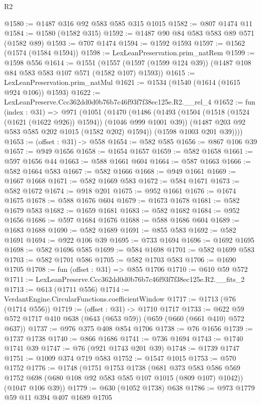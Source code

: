 \begin{lexlean}{R2}
\begin{coremodule}
@1580 := @1487 @316 @92 @583 @585 @315 @1015
@1582 := @807 @1474 @11
@1584 := @1580 (@1582 @315)
@1592 := @1487 @90 @84 @583 @583 @89 @571 (@1582 @89)
@1593 := @707 @1474
@1594 := @1592 @1593
@1597 := @1562 (@1574 (@1584 @1594))
@1598 := LexLeanPreservation.prim_natRem
@1599 := @1598 @556
@1614 := @1551
    (@1557 (@1597 (@1599 @124 @39)) (@1487 @108 @84 @583 @583 @107 @571 (@1582 @107) @1593))
@1615 := LexLeanPreservation.prim_natMul
@1621 := @1534 (@1540 (@1614 (@1615 @924 @106)) @1593)
@1622 := LexLeanPreserve.Ccc362dd0d0b76b7c46f93f7f38ec125e.R2.__rel_4
@1652 := fun (index : @31) =>
  @971
    (@1051
      (@1470
        (@1486
          (@1493
            (@1504 (@1518 (@1524 (@1621 (@1622 @926)) @1594)) (@1046 @999 @1001 @39))
            (@1487 @203 @92 @583 @585 @202 @1015 (@1582 @202) @1594))
          (@1598 @1003 @201 @39))))
@1653 := (offset : @31) -> @558
@1654 := @582 @585
@1656 := @867 @106 @39
@1657 := @949 @1656
@1658 := @1654 @1657
@1659 := @582 @1658
@1661 := @597 @1656 @44
@1663 := @588 @1661 @604
@1664 := @587 @1663
@1666 := @582 @1664 @583
@1667 := @582 @1666
@1668 := @949 @1661
@1669 := @1667 @1668
@1671 := @582 @1669 @583
@1672 := @584 @1671
@1673 := @582 @1672
@1674 := @918 @201
@1675 := @952 @1661
@1676 := @1674 @1675
@1678 := @588 @1676 @604
@1679 := @1673 @1678
@1681 := @582 @1679 @583
@1682 := @1659 @1681
@1683 := @582 @1682
@1684 := @952 @1656
@1686 := @597 @1684 @1676
@1688 := @588 @1686 @604
@1689 := @1683 @1688
@1690 := @582 @1689
@1691 := @855 @583
@1692 := @582 @1691
@1694 := @922 @106 @39
@1695 := @733 @1694
@1696 := @1692 @1695
@1698 := @582 @1696 @585
@1699 := @584 @1698
@1701 := @582 @1699 @583
@1703 := @582 @1701 @586
@1705 := @582 @1703 @583
@1706 := @1690 @1705
@1708 := fun (offset : @31) => @855 @1706
@1710 := @610 @59 @572
@1711 := LexLeanPreserve.Ccc362dd0d0b76b7c46f93f7f38ec125e.R2.__fits_2
@1713 := @613 (@1711 @556)
@1714 := VerdantEngine.CircularFunctions.coefficientWindow
@1717 := @1713 (@76 (@1714 @556))
@1719 := (offset : @31) -> @1710 @1717
@1733 := @622 @59 @572 @1717 @410 @638 (@643 (@653 @59)) (@659 (@660 (@661 @410) @572 @637))
@1737 := @976 @375 @408 @854 @1706
@1738 := @76 @1656
@1739 := @1737 @1738
@1740 := @866 @1686
@1741 := @736 @1694
@1743 := @1740 @1741 @39
@1747 := @76 (@921 @1743 @201 @39)
@1748 := @1739 @1747
@1751 := @1009 @374 @719 @583
@1752 := @1547 @1015
@1753 := @570 @1752
@1776 := @1748
    (@1751
      @1753
      @1738
      (@681 @373 @583 @586 @569 @1752 @698 (@680 @108 @92 @583 @585 @107 @1015 (@809 @107) @1042))
      (@1047 @106 @39))
@1779 := @630 (@1052 @1738) @638
@1786 := @973 @1779 @59 @11 @394 @407 @1689 @1705

\end{coremodule}
\end{lexlean}
